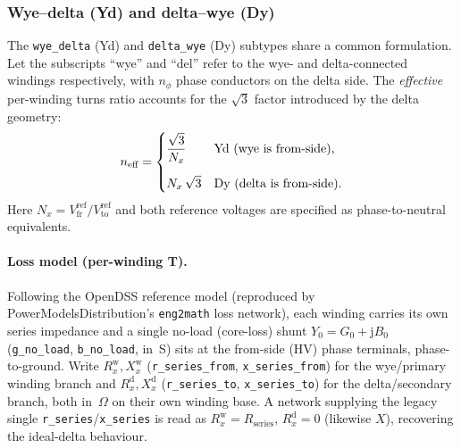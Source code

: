 \documentclass[11pt,a4paper]{article}
\begin{document}
\subsubsection*{Wye--delta (Yd) and delta--wye (Dy)}

The \texttt{wye\_delta} (Yd) and \texttt{delta\_wye} (Dy) subtypes share a
common formulation.  Let the subscripts ``wye'' and ``del'' refer to the wye-
and delta-connected windings respectively, with $n_\phi$ phase conductors on the
delta side.  The \emph{effective} per-winding turns ratio accounts for the
$\sqrt{3}$ factor introduced by the delta geometry:
%
\begin{equation}
  n_\text{eff} =
  \begin{dcases}
    \dfrac{\sqrt{3}}{N_x} & \text{Yd (wye is from-side)},\\[6pt]
    N_x\,\sqrt{3}         & \text{Dy (delta is from-side)}.
  \end{dcases}
\end{equation}
%
Here $N_x = V^\text{ref}_\text{fr} / V^\text{ref}_\text{to}$ and both reference
voltages are specified as phase-to-neutral equivalents.

\paragraph{Loss model (per-winding T).}
Following the OpenDSS reference model (reproduced by PowerModelsDistribution's
\texttt{eng2math} loss network), each winding carries its own series impedance
and a single no-load (core-loss) shunt $Y_0 = G_0 + \mathrm{j}B_0$
(\texttt{g\_no\_load}, \texttt{b\_no\_load}, in~S) sits at the from-side (HV)
phase terminals, phase-to-ground.  Write $R^\text{w}_x, X^\text{w}_x$
(\texttt{r\_series\_from}, \texttt{x\_series\_from}) for the wye/primary winding
branch and $R^\text{d}_x, X^\text{d}_x$
(\texttt{r\_series\_to}, \texttt{x\_series\_to}) for the delta/secondary branch,
both in~$\Omega$ on their own winding base.  A network supplying the legacy
single \texttt{r\_series}/\texttt{x\_series} is read as
$R^\text{w}_x = R_\text{series}$, $R^\text{d}_x = 0$ (likewise $X$),
recovering the ideal-delta behaviour.
\end{document}
